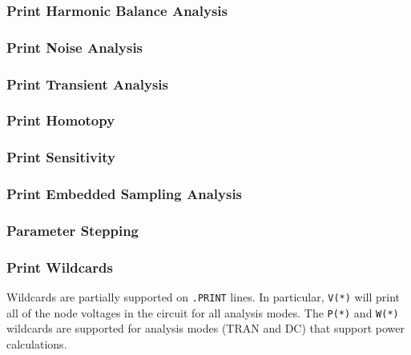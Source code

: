 \subsubsection{Print Harmonic Balance Analysis}


\subsubsection{Print Noise Analysis}


\subsubsection{Print Transient Analysis}


\subsubsection{Print Homotopy}
\label{Print_Homotopy}


\subsubsection{Print Sensitivity}
\label{Print_Sensitivity}


\subsubsection{Print Embedded Sampling Analysis}


\subsubsection{Parameter Stepping}
\label{Print_Step}


\subsubsection{Print Wildcards}
Wildcards are partially supported on \texttt{.PRINT} lines. In particular,
\texttt{V(*)} will print all of the node voltages in the circuit for all
analysis modes.  The \texttt{P(*)}  and \texttt{W(*)} wildcards are supported
for analysis modes (TRAN and DC) that support power calculations.

